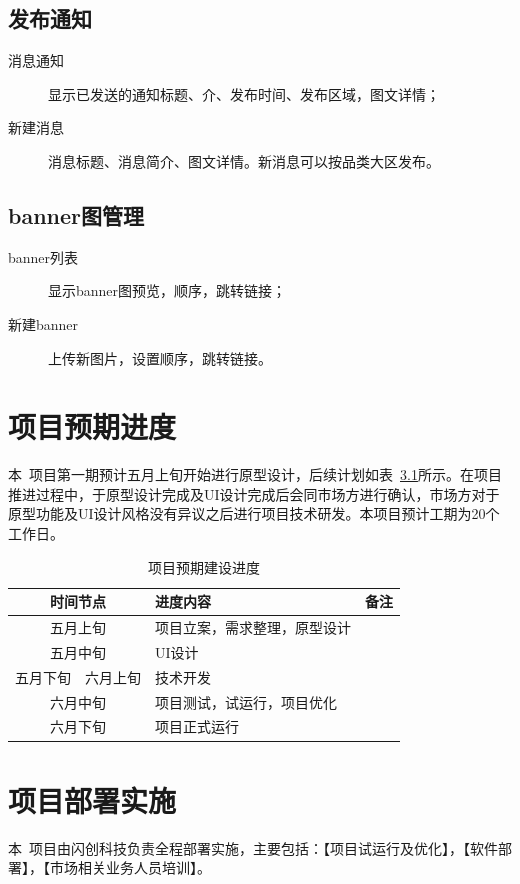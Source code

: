 \documentclass[12pt,a4paper,openany]{ctexrep}
\begin{document}
\section{发布通知}
\begin{description}
\item[消息通知]显示已发送的通知标题、介、发布时间、发布区域，图文详情；
\item[新建消息]消息标题、消息简介、图文详情。新消息可以按品类大区发布。
\end{description}

\section{banner图管理}
\begin{description}
\item[banner列表]显示banner图预览，顺序，跳转链接；
\item[新建banner]上传新图片，设置顺序，跳转链接。
\end{description}

\chapter{项目预期进度}
\lettrine[lines=2]{本}\, 项目第一期预计五月上旬开始进行原型设计，后续计划如表~\ref{schedule}所示。在项目推进过程中，于原型设计完成及UI设计完成后会同市场方进行确认，市场方对于原型功能及UI设计风格没有异议之后进行项目技术研发。本项目预计工期为20个工作日。
\begin{table}[htbp]
\begin{tabular*}{\hsize}{p{2.5cm}<{\centering}@{-}p{2.5cm}<{\centering}|p{7cm}|p{3cm}}
\hline
\multicolumn{2}{c|}{时间节点}		&	进度内容				&	备注	\\
\hline
\multicolumn{2}{c|}{五月上旬}		&	项目立案，需求整理，原型设计		&			\\
\multicolumn{2}{c|}{五月中旬}		&	UI设计								&			\\
五月下旬		&		六月上旬		&	技术开发							&			\\
\multicolumn{2}{c|}{六月中旬}		&	项目测试，试运行，项目优化		&			\\
\multicolumn{2}{c|}{六月下旬}		&	项目正式运行						&			\\
\hline
\end{tabular*}
\caption{项目预期建设进度}
\label{schedule}
\end{table}

\chapter{项目部署实施}
\label{arrange}
\lettrine[lines=2]{本}\, 项目由闪创科技负责全程部署实施，主要包括：【项目试运行及优化】，【软件部署】，【市场相关业务人员培训】。
\end{document}
